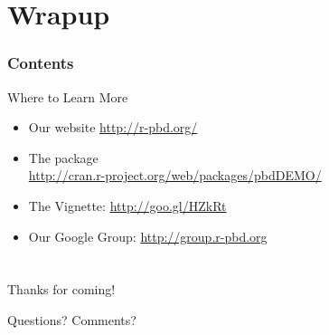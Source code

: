 \section{Wrapup}

\hidenum
\begin{frame}[noframenumbering]
\frametitle{Contents}
 \tableofcontents[currentsection,hideothersubsections,sectionstyle=show/hide]
\end{frame}
\shownum

\begin{frame}
  \begin{block}{Where to Learn More}
    \begin{itemize}
      \item Our website \url{http://r-pbd.org/}
      \item The  package\\
      \url{http://cran.r-project.org/web/packages/pbdDEMO/}\\
      \item The  Vignette: \url{http://goo.gl/HZkRt}
      \item Our Google Group: \url{http://group.r-pbd.org}
    \end{itemize}
\end{block}
\end{frame}


\section*{}
\hidenum

\begin{frame}[noframenumbering]
 \begin{block}{Thanks for coming!}
 \begin{center}
     {\Large Questions?  Comments?}\\[.6cm]
  \end{center}
 \end{block}
\end{frame}
